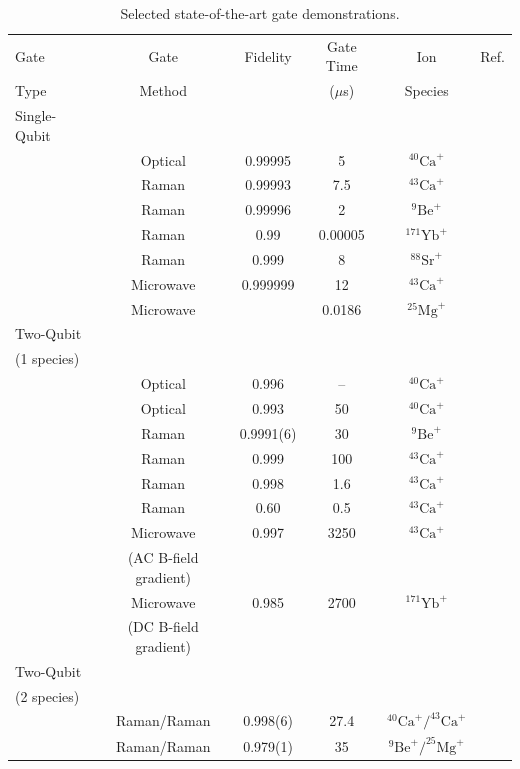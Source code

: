 \documentclass[%
12pt,
 amsmath,amssymb,
]{revtex4-2}
\begin{document}
\begin{table}
\caption{Selected state-of-the-art gate demonstrations.}
\renewcommand{\arraystretch}{1.15}
\begin{tabular}{l c c c c c}
\hline
\hline
Gate & Gate & Fidelity & Gate Time & Ion & Ref. \\
 Type & Method & & ($\mu$s) & Species \\
\hline

Single-Qubit & & &\\
 & Optical & 0.99995 & 5 &$^{40}\mathrm{Ca}^{+}$ & \cite{BermudezAssessing2017}\\
 & Raman & 0.99993  & 7.5  & $^{43}\mathrm{Ca}^{+}$ &\cite{Ballance2QubitHyperfineGate2016}\\
 & Raman & 0.99996  & 2  & $^{9}\mathrm{Be}^{+}$ & \cite{nist_gate_2016} \\
 & Raman & 0.99  & 0.00005  & $^{171}\mathrm{Yb}^{+}$ & \cite{CampbellUltrafast2010} \\
 & Raman & 0.999  & 8  & $^{88}\mathrm{Sr}^{+}$ & \cite{KeselmanZeemanQubit2011} \\
 & Microwave & 0.999999 & 12& $^{43}\mathrm{Ca}^{+}$ &\cite{HartyHighFidelityIons2014}\\
 & Microwave &  & 0.0186& $^{25}\mathrm{Mg}^{+}$& \cite{ospelkaus2011microwave}\\
Two-Qubit & & &\\
(1 species) \\
 & Optical & 0.996 & --& $^{40}\mathrm{Ca}^{+}$ & \cite{ErhardBlattCycleBench2019}\\
 & Optical & 0.993 & 50& $^{40}\mathrm{Ca}^{+}$ & \cite{BenhelmMSGate2008}\\
 & Raman & 0.9991(6) & 30 &  $^{9}\mathrm{Be}^{+}$ & \cite{nist_gate_2016} \\
 & Raman & 0.999 & 100 &  $^{43}\mathrm{Ca}^{+}$ &  \cite{Ballance2QubitHyperfineGate2016}\\
 & Raman & 0.998 & 1.6 &  $^{43}\mathrm{Ca}^{+}$ & \cite{SchaferFastIonGates2018}\\
 & Raman & 0.60 & 0.5 &  $^{43}\mathrm{Ca}^{+}$ & \cite{SchaferFastIonGates2018}\\
 & Microwave & 0.997 & 3250 &  $^{43}\mathrm{Ca}^{+}$ & \cite{HartyNearFieldMicrowaves2016}\\
& (AC B-field gradient) & \\
 & Microwave & 0.985 & 2700 & $^{171}\mathrm{Yb}^{+}$ &\cite{WeidtMicrowaveGates2017}\\
 & (DC B-field gradient) &\\
Two-Qubit & & &\\
(2 species) \\
& Raman/Raman & 0.998(6) & 27.4 &  $^{40}\mathrm{Ca}^{+}/^{43}\mathrm{Ca}^{+}$ & \cite{BallanceHybridLogic2015} \\
& Raman/Raman & 0.979(1) & 35 &  $^{9}\mathrm{Be}^{+}/^{25}\mathrm{Mg}^{+}$ & \cite{TanMultiElement2015}\\
\hline
\hline
\end{tabular}
\label{table:gateperformance}
\end{table}
\end{document}

